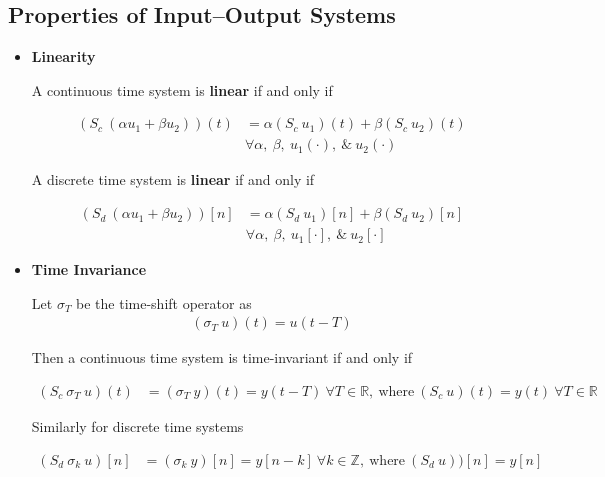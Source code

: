 \documentclass[twoside]{article}
\begin{document}
\vspace{12pt}

\subsection{Properties of Input--Output Systems}

\begin{itemize}

\item \textbf{Linearity} 
\vspace{6pt}

A continuous time system is \textbf{linear} if and only if

\begin{align*}
(S_c \ (\alpha u_1 + \beta u_2) ) (t) &= \alpha  (S_c \ u_1) (t) +
  \beta  (S_c \ u_2 ) (t) \\ 
&\forall \alpha , \ \beta, \ u_1(\cdot), \ \& \ u_2(\cdot) 
\end{align*}

A discrete time system is \textbf{linear} if and only if

\begin{align*}
(S_d \ (\alpha u_1 + \beta u_2) ) [n] &= \alpha  (S_d \ u_1) [n] +
  \beta  (S_d \ u_2 ) [n] \\ 
&\forall \alpha , \ \beta, \ u_1[\cdot], \ \& \ u_2[\cdot] 
\end{align*}

\item \textbf{Time Invariance}
\vspace{6pt}

Let $\sigma_T$ be the time-shift operator as
%
\begin{align*}
( \sigma_T \ u )(t) = u(t-T)
\end{align*}

Then a continuous time system is time-invariant if and only if 

\begin{align*}
(S_c \ \sigma_T \ u)  (t) &=  ( \sigma_T \ y )(t) = y(t - T) \ \forall T \in \mathbb{R}, \
                             \mathrm{where} \ (S_c \ u ) (t) = y(t) \ \forall T \in \mathbb{R}
\end{align*}

\vspace{6pt}

Similarly for discrete time systems

\begin{align*}
(S_d \ \sigma_k \ u)  [n] &= (\sigma_k \ y)  [n]  = y[n-k] \ \forall k \in \mathbb{Z}, \ \mathrm{where} \ (S_d \ u) ) [n] = y[n]
\end{align*}


\end{itemize}
\end{document}
